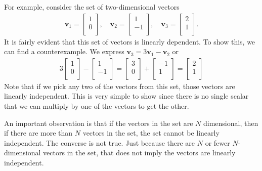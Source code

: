 For example, consider the set of two-dimensional vectors
\begin{align}
  \mathbf{v}_1 = \left[ \begin{array}{c} 1 \\  0 \\ \end{array} \right] , \quad
  \mathbf{v}_2 = \left[ \begin{array}{c} 1 \\ -1 \\ \end{array} \right] , \quad  
  \mathbf{v}_3 = \left[ \begin{array}{c} 2 \\  1 \\ \end{array} \right] .
\end{align}
It is fairly evident that this set of vectors is linearly dependent. To show this, we can find a counterexample. We express $\mathbf{v}_3 = 3 \mathbf{v}_1 - \mathbf{v}_2$ or
\begin{align}
   3 \left[ \begin{array}{c} 1 \\  0 \\ \end{array} \right]
 -   \left[ \begin{array}{c} 1 \\ -1 \\ \end{array} \right] =
     \left[ \begin{array}{c} 3 \\  0 \\ \end{array} \right]  
 +   \left[ \begin{array}{c} -1 \\ 1 \\ \end{array} \right] =
   \left[ \begin{array}{c} 2 \\  1 \\ \end{array} \right]
\end{align}
Note that if we pick any two of the vectors from this set, those vectors are linearly independent. This is very simple to show since there is no single scalar that we can multiply by one of the vectors to get the other. 

An important observation is that if the vectors in the set are $N$ dimensional, then if there are more than $N$ vectors in the set, the set cannot be linearly independent. The converse is not true. Just because there are $N$ or fewer $N$-dimensional vectors in the set, that does not imply the vectors are linearly independent.

